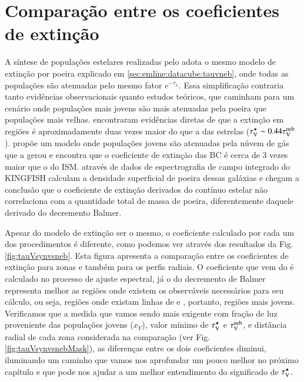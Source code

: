 
\section{Comparação entre os coeficientes de extinção}
\label{sec:synvsneb:tauv}

A síntese de populações estelares realizadas pelo \starlight adota o mesmo modelo de extinção por
poeira explicado em \ref{sec:emline:datacube:tauvneb}, onde todas as populações são atenuadas pelo
mesmo fator $e^{-\tau_\lambda}$. Essa simplificação contraria tanto evidências observacionais quanto
estudos teóricos, que caminham para um cenário onde populações mais jovens são mais atenuadas pela
poeira que populações mais velhas. \citet{Calzetti.etal.1994a} encontraram evidências diretas de que
a extinção em regiões \Hii é aproximadamente duas vezes maior do que a das estrelas ($\tau_{\mathrm{V}}^\star \sim
0.44 \tau_{\mathrm{V}}^{\mathrm{neb}}$). \citet{Charlot.Fall.2000a} propõe um modelo onde populações jovens são atenuadas pela
núvem de gás que a gerou e encontra que o coeficiente de extinção das BC é cerca de 3 vezes maior
que o do ISM. \citet{Kreckel.etal.2013a} através de dados de espectrografia de campo integrado do
KINGFISH calculam a densidade superficial de poeira dessas galáxias e chegam a conclusão que o
coeficiente de extinção derivados do contínuo estelar não correlaciona com a quantidade total de
massa de poeira, diferentemente daquele derivado do decremento Balmer.

Apesar do modelo de extinção ser o mesmo, o coeficiente calculado por cada um dos procedimentos é
diferente, como podemos ver através dos resultados da Fig. \ref{fig:tauVsynvsneb}. Esta figura
apresenta a comparação entre os coeficientes de extinção para zonas e também para os perfis radiais.
O coeficiente que vem do \starlight é calculado no processo de ajuste espectral, já o do decremento
de Balmer representa melhor as regiões onde existem os observáveis necessários para seu cálculo, ou
seja, regiões onde existam linhas de \Halpha e \Hbeta, portanto, regiões mais jovens. Verificamos
que a medida que vamos sendo mais exigente com fração de luz proveniente das populações jovens
($x_Y$), valor mínimo de $\tau_{\mathrm{V}}^\star$ e $\tau_{\mathrm{V}}^{\mathrm{neb}}$, e distância radial de cada zona considerada na
comparação (ver Fig. \ref{fig:tauVsynvsnebMask}), as diferenças entre os dois coeficientes diminui,
iluminando um caminho que vamos nos aprofundar um pouco melhor no próximo capítulo e que pode nos
ajudar a um melhor entendimento do significado de $\tau_{\mathrm{V}}^\star$.

